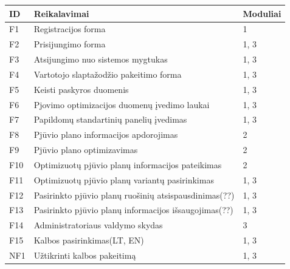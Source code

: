 \documentclass[a4paper,12pt]{article}
\begin{document}
\begin{frame}
\centering

\label{my-label}
\begin{tabular}{|l|l|l|}
\hline
\textbf{ID}	& \textbf{Reikalavimai}							& \textbf{Moduliai}  \\ \hline

F1	& Registracijos forma									& 1	     		\\ \hline

F2	& Prisijungimo forma										& 1, 3			\\ \hline

F3	& Atsijungimo nuo sistemos mygtukas						& 1, 3			\\ \hline

F4	& Vartotojo slaptažodžio pakeitimo forma					& 1, 3			\\ \hline

F5	& Keisti paskyros duomenis	 	  						& 1, 3			\\ \hline 

F6	& Pjovimo optimizacijos duomenų įvedimo laukai			& 1, 3			\\ \hline

F7  & Papildomų standartinių panelių įvedimas 				& 1, 3			\\ \hline

F8	& Pjūvio plano informacijos apdorojimas					& 2				\\ \hline

F9	& Pjūvio plano optimizavimas           	   				& 2				\\ \hline

F10	& Optimizuotų pjūvio planų informacijos pateikimas		& 2     			\\ \hline

F11	& Optimizuotų pjūvio planų variantų pasirinkimas			& 1, 3			\\ \hline

F12	& Pasirinkto pjūvio planų ruošinių atsispausdinimas(??)	& 1, 3			\\ \hline

F13	& Pasirinkto pjūvio planų informacijos išsaugojimas(??)	& 1, 3			\\ \hline

F14	& Administratoriaus valdymo skydas	 	  				& 3				\\ \hline

F15	& Kalbos pasirinkimas(LT, EN)							& 1, 3			\\ \hline

NF1 & Užtikrinti kalbos pakeitimą							& 1, 3			\\ \hline


\end{tabular}
\end{frame}
\end{document}
